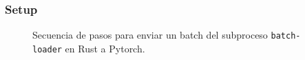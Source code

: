 \begin{frame}
\frametitle{Setup}
\begin{figure}[H]
\centering
{}
\caption{Secuencia de pasos para enviar un batch del subproceso \texttt{batch-loader} en Rust a Pytorch.}
\end{figure}
\end{frame}

